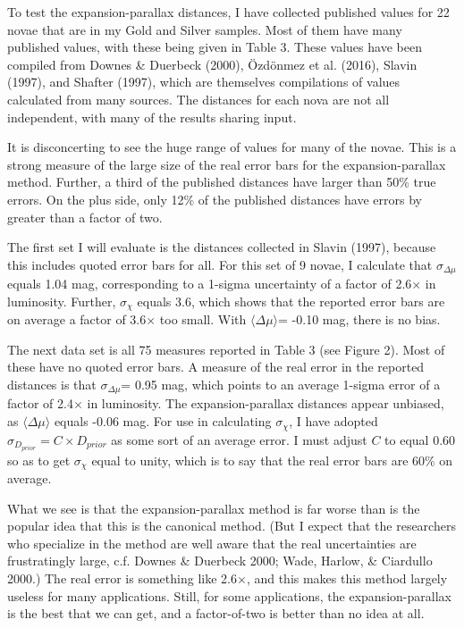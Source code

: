 \documentclass[a4paper,fleqn,usenatbib]{mnras}
\begin{document}
To test the expansion-parallax distances, I have collected published values for 22 novae that are in my Gold and Silver samples.  Most of them have many published values, with these being given in Table 3.  These values have been compiled from Downes \& Duerbeck (2000), \"{O}zd\"{o}nmez et al. (2016), Slavin (1997), and Shafter (1997), which are themselves compilations of values calculated from many sources.  The distances for each nova are not all independent, with many of the results sharing input.

It is disconcerting to see the huge range of values for many of the novae.  This is a strong measure of the large size of the real error bars for the expansion-parallax method.  Further, a third of the published distances have larger than 50\% true errors.  On the plus side, only 12\% of the published distances have errors by greater than a factor of two.

The first set I will evaluate is the distances collected in Slavin (1997), because this includes quoted error bars for all.  For this set of 9 novae, I calculate that $\sigma _{\Delta \mu}$ equals 1.04 mag, corresponding to a 1-sigma uncertainty of a factor of 2.6$\times$ in luminosity.  Further, $\sigma _{\chi}$ equals 3.6, which shows that the reported error bars are on average a factor of 3.6$\times$ too small.  With $\langle \Delta \mu \rangle$= -0.10 mag, there is no bias.  

The next data set is all 75 measures reported in Table 3 (see Figure 2).  Most of these have no quoted error bars.  A measure of the real error in the reported distances is that $\sigma _{\Delta \mu}$= 0.95 mag, which points to an average 1-sigma error of a factor of 2.4$\times$ in luminosity.  The expansion-parallax distances appear unbiased, as $\langle \Delta \mu \rangle$ equals -0.06 mag.  For use in calculating $\sigma _{\chi}$, I have adopted $\sigma_{D_{prior}}=C\times D_{prior}$ as some sort of an average error.  I must adjust $C$ to equal 0.60 so as to get $\sigma _{\chi}$ equal to unity, which is to say that the real error bars are 60\% on average.

What we see is that the expansion-parallax method is far worse than is the popular idea that this is the canonical method.  (But I expect that the researchers who specialize in the method are well aware that the real uncertainties are frustratingly large, c.f. Downes \& Duerbeck 2000; Wade, Harlow, \& Ciardullo 2000.)  The real error is something like 2.6$\times$, and this makes this method largely useless for many applications.  Still, for some applications, the expansion-parallax is the best that we can get, and a factor-of-two is better than no idea at all.
\end{document}
